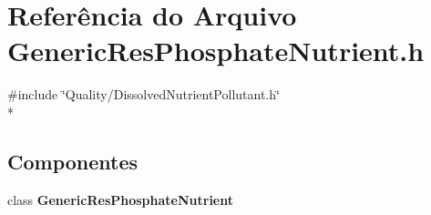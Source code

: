 \section{Referência do Arquivo Generic\+Res\+Phosphate\+Nutrient.\+h}
\label{_generic_res_phosphate_nutrient_8h}
{\ttfamily \#include \char`\"{}Quality/\+Dissolved\+Nutrient\+Pollutant.\+h\char`\"{}}\\*
\subsection*{Componentes}
\begin{DoxyCompactItemize}
\item 
class {\bf Generic\+Res\+Phosphate\+Nutrient}
\end{DoxyCompactItemize}

